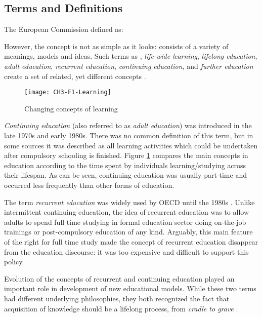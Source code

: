 \subsection{Terms and Definitions}

The European Commission \citeyearpar{EuropeanCommission2000} defined \LLLs as:


However, the concept is not as simple as it looks: \LLLs consists of a variety
of meanings, models and ideas. Such terms as \textit{\LLLsn}, \textit{life-wide
learning}, \textit{lifelong education}, \textit{adult education},
\textit{recurrent education}, \textit{continuing education}, and \textit{further
education} create a set of related, yet different concepts \citep{Hager2011}.

\begin{figure}[htb]
\centering
\texttt{[image: CH3-F1-Learning]}
\caption[Changing concepts of learning]{Changing concepts of learning 
\citep{Jarvis2004}}
\label{fig:learning}
\end{figure}

\textit{Continuing education} (also referred to as \textit{adult education}) was
introduced in the late 1970s and early 1980s. There was no common definition of
this term, but in some sources  \citep{Jarvis2004} it was described as all
learning activities which could be undertaken after compulsory schooling is
finished. Figure \ref{fig:learning} compares the main concepts in education
according to the time spent by individuals learning/studying across their
lifespan. As can be seen, continuing education was usually part-time and
occurred less frequently than other forms of education.

\FloatBarrier
The term \textit{recurrent education} was widely used by OECD until the 1980s
\citep{Jarvis2004}. Unlike intermittent continuing education, the idea of
recurrent education was to allow adults to spend full time studying in
formal education sector doing on-the-job trainings or post-compulsory education
of any kind. Arguably, this main feature of the right for full time study made
the concept of recurrent education disappear from the education discourse: it
was too expensive and difficult to support this policy.

Evolution of the concepts of recurrent and continuing education played an
important role in development of new educational models. While these two terms
had different underlying philosophies, they both recognized the fact that
acquisition of knowledge should be a lifelong process, from \textit{cradle to
grave} \citep{Hargreaves2004}.

